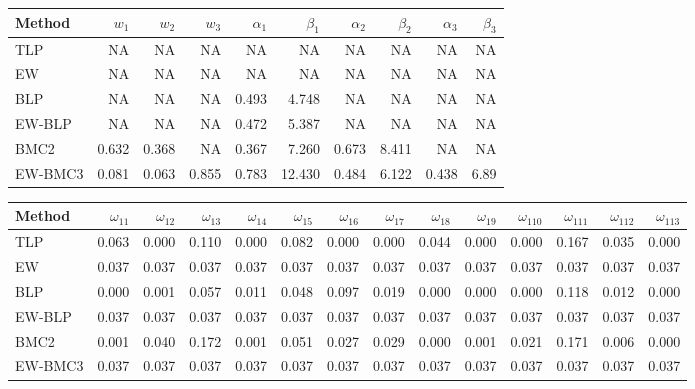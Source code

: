 \documentclass[
]{article}
\begin{document}
\begin{tabular}{lrrrrrrrrr}
\toprule
Method & $w_1$ & $w_2$ & $w_3$ & $\alpha_1$ & $\beta_1$ & $\alpha_2$ & $\beta_2$ & $\alpha_3$ & $\beta_3$\\
\midrule
TLP & NA & NA & NA & NA & NA & NA & NA & NA & NA\\
EW & NA & NA & NA & NA & NA & NA & NA & NA & NA\\
BLP & NA & NA & NA & 0.493 & 4.748 & NA & NA & NA & NA\\
EW-BLP & NA & NA & NA & 0.472 & 5.387 & NA & NA & NA & NA\\
BMC2 & 0.632 & 0.368 & NA & 0.367 & 7.260 & 0.673 & 8.411 & NA & NA\\
EW-BMC3 & 0.081 & 0.063 & 0.855 & 0.783 & 12.430 & 0.484 & 6.122 & 0.438 & 6.89\\
\bottomrule
\end{tabular}

\begin{tabular}{lrrrrrrrrrrrrr}
\toprule
Method & $\omega_{11}$ & $\omega_{12}$ & $\omega_{13}$ & $\omega_{14}$ & $\omega_{15}$ & $\omega_{16}$ & $\omega_{17}$ & $\omega_{18}$ & $\omega_{19}$ & $\omega_{110}$ & $\omega_{111}$ & $\omega_{112}$ & $\omega_{113}$\\
\midrule
TLP & 0.063 & 0.000 & 0.110 & 0.000 & 0.082 & 0.000 & 0.000 & 0.044 & 0.000 & 0.000 & 0.167 & 0.035 & 0.000\\
EW & 0.037 & 0.037 & 0.037 & 0.037 & 0.037 & 0.037 & 0.037 & 0.037 & 0.037 & 0.037 & 0.037 & 0.037 & 0.037\\
BLP & 0.000 & 0.001 & 0.057 & 0.011 & 0.048 & 0.097 & 0.019 & 0.000 & 0.000 & 0.000 & 0.118 & 0.012 & 0.000\\
EW-BLP & 0.037 & 0.037 & 0.037 & 0.037 & 0.037 & 0.037 & 0.037 & 0.037 & 0.037 & 0.037 & 0.037 & 0.037 & 0.037\\
BMC2 & 0.001 & 0.040 & 0.172 & 0.001 & 0.051 & 0.027 & 0.029 & 0.000 & 0.001 & 0.021 & 0.171 & 0.006 & 0.000\\
EW-BMC3 & 0.037 & 0.037 & 0.037 & 0.037 & 0.037 & 0.037 & 0.037 & 0.037 & 0.037 & 0.037 & 0.037 & 0.037 & 0.037\\
\bottomrule
\end{tabular}
\end{document}
